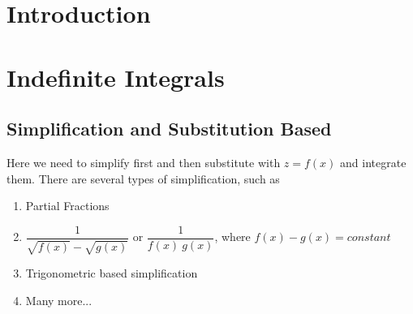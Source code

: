 \documentclass[12pt,a4paper,twoside]{book}
\title{\LARGE \TITLE \\ [10pt]
\large \SUBTITLE
}
\author{\AUTHOR}
\date{\DATE}
\begin{document}
\maketitle
\tableofcontents

\chapter*{Introduction}
  \lipsum[1-5]


\chapter{Indefinite Integrals}

\section{Simplification and Substitution Based}
Here we need to simplify first and then substitute with $z=f(x)$ and integrate them. There are several types of simplification, such as 
\begin{enumerate}
\item Partial Fractions
\item $\dfrac{1}{\sqrt{f(x)}-\sqrt{g(x)}}$ or $\dfrac{1}{f(x)\ g(x)}$, where $f(x)-g(x)=constant$
\item Trigonometric based simplification
\item Many more...
\end{enumerate}
\vspace{0.05cm}
\end{document}

